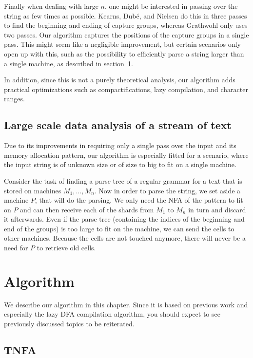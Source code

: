 \documentclass[11pt,a4paper,twoside,openright]{Thesis}
\theoremstyle{definition}
\newcommand{\Secref}[1]{section~\ref{sec:#1}}
\newcommand{\seclabel}[1]{\label{sec:#1}}
\begin{document}
Finally when dealing with large $n$, one might be interested in passing over
the string as few times as possible. Kearns, Dub\'e, and Nielsen do this in
three passes to find the beginning and ending of capture groups, whereas
Grathwohl only uses two passes. Our algorithm captures the positions of the
capture groups in a single pass. This might seem like a negligible 
improvement, but certain scenarios only open up with this, such as the 
possibility to efficiently parse a string larger than a single machine, as 
described in \Secref{stream}.

In addition, since this is not a purely theoretical analysis, our algorithm
adds practical optimizations such as compactifications, lazy compilation, and
character ranges.

\section{Large scale data analysis of a stream of text}\label{sec:stream}
Due to its improvements in requiring only a single pass over the input and
its memory allocation pattern, our algorithm is especially fitted for a
scenario, where the input string is of unknown size or of size to big to fit
on a single machine.

Consider the task of finding a parse tree of a regular grammar for a text
that is stored on machines $M_1, \dots, M_n$. Now in order to parse the
string, we set aside a machine $P$, that will do the parsing. We only need the NFA of the
pattern to fit on $P$ and can then receive each of the shards
from $M_1$ to $M_n$ in turn and discard it afterwards. Even if the parse tree
(containing the indices of the beginning and end of the groups) is too large
to fit on the machine, we can send the cells to other machines. Because the
cells are not touched anymore, there will never be a need for $P$ to retrieve
old cells.

\chapter{Algorithm} \seclabel{algo}
We describe our algorithm in this chapter. Since it is based on previous
work and especially the lazy DFA compilation algorithm, you should expect to
see previously discussed topics to be reiterated.

\section{TNFA}\label{sec:tnfa}
\end{document}
